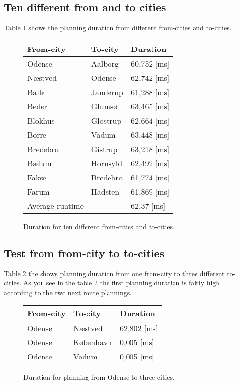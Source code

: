 \subsection{Ten different from and to cities}
Table \ref{tb:fromtoten} shows the planning duration from different from-cities and to-cities.
\begin{figure}[th!]
\centering
\begin{tabular}{l|l|l}
From-city & To-city & Duration \\\hline
Odense & Aalborg & 60,752 [ms] \\
Næstved & Odense & 62,742 [ms] \\
Balle & Janderup & 61,288 [ms] \\
Beder & Glumsø & 63,465 [ms] \\
Blokhus & Glostrup & 62,664 [ms] \\
Borre & Vadum & 63,448 [ms] \\
Bredebro & Gistrup & 63,218 [ms] \\
Bælum & Hornsyld & 62,492 [ms] \\
Fakse & Bredebro & 61,774 [ms] \\
Farum & Hadsten & 61,869 [ms] \\\hline
Average runtime && 62,37 [ms]
\end{tabular}
\captionsetup{type=table}
\caption[tekst i indholdsfortegnelsen]{Duration for ten different from-cities and to-cities.}
\label{tb:fromtoten}
\end{figure}



\subsection{Test from from-city to to-cities}
Table \ref{tb:fromonetocities} the shows planning duration from one from-city to three different to-cities. As you see in the table \ref{tb:fromonetocities} the first planning duration is fairly high according to the two next route plannings.
\begin{figure}[th!]
\centering
\begin{tabular}{l|l|l}
From-city & To-city & Duration \\\hline
Odense & Næstved & 62,802 [ms] \\
Odense & København & 0,005 [ms] \\
Odense & Vadum & 0,005 [ms]  
\end{tabular}
\captionsetup{type=table}
\caption[tekst i indholdsfortegnelsen]{Duration for planning from Odense to three cities.}
\label{tb:fromonetocities}
\end{figure}


